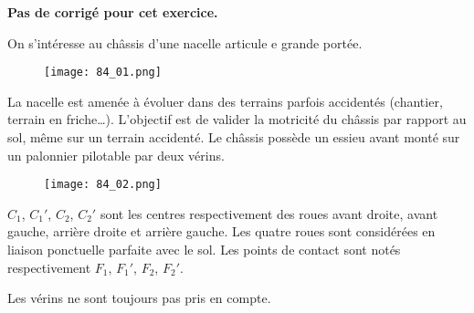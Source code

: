 \normaltrue \difficilefalse \tdifficilefalse
\correctionfalse

\setcounter{numques}{0}


\ifcorrection
\else
\textbf{Pas de corrigé pour cet exercice.}
\fi


\ifprof
\else
On s'intéresse au châssis d'une nacelle articule e grande portée.

\begin{figure}[H]
\centering
\texttt{[image: 84\_01.png]}
\end{figure} 

La nacelle est amenée à évoluer dans des terrains parfois accidentés (chantier, terrain en friche…).
L’objectif est de valider la motricité du châssis par rapport au sol, même sur un terrain accidenté. 
Le châssis possède un essieu avant monté sur un palonnier pilotable par deux vérins.


\begin{figure}[H]
\centering
\texttt{[image: 84\_02.png]}
\end{figure} 


$C_1$, $C_1'$, $C_2$, $C_2'$ sont les centres respectivement des roues avant droite, avant gauche, arrière droite 
et arrière gauche. Les quatre roues sont considérées en liaison ponctuelle parfaite avec le sol. Les 
points de contact sont notés respectivement $F_1$, $F_1'$, $F_2$, $F_2'$.





Les vérins ne sont toujours pas pris en compte. 

